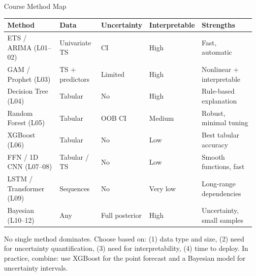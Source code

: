 \documentclass[aspectratio=169, 11pt]{beamer}
\begin{document}
\begin{frame}{Course Method Map}
  \begin{center}
    {\scriptsize
    \begin{tabular}{lllll}
      \toprule
      \textbf{Method} & \textbf{Data} & \textbf{Uncertainty} & \textbf{Interpretable} & \textbf{Strengths} \\
      \midrule
      ETS / ARIMA (L01--02) & Univariate TS & CI & High & Fast, automatic \\
      GAM / Prophet (L03) & TS + predictors & Limited & High & Nonlinear + interpretable \\
      Decision Tree (L04) & Tabular & No & High & Rule-based explanation \\
      Random Forest (L05) & Tabular & OOB CI & Medium & Robust, minimal tuning \\
      XGBoost (L06) & Tabular & No & Low & Best tabular accuracy \\
      FFN / 1D CNN (L07--08) & Tabular / TS & No & Low & Smooth functions, fast \\
      LSTM / Transformer (L09) & Sequences & No & Very low & Long-range dependencies \\
      Bayesian (L10--12) & Any & Full posterior & High & Uncertainty, small samples \\
      \bottomrule
    \end{tabular}
    }
  \end{center}
  \begin{keybox}
    \small No single method dominates. Choose based on:
    (1) data type and size, (2) need for uncertainty quantification,
    (3) need for interpretability, (4) time to deploy.
    In practice, combine: use XGBoost for the point forecast
    and a Bayesian model for uncertainty intervals.
  \end{keybox}
\end{frame}
\end{document}
